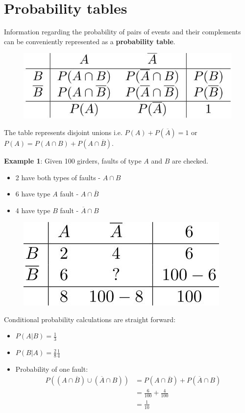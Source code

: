 \documentclass[10pt,a4paper]{article}
\begin{document}
\section{Probability tables}

Information regarding the probability of pairs of events and their complements can be conveniently
represented as a \textbf{probability table}.

\begin{figure} [h!]
    \centering
    \includegraphics[scale=0.5]{prob table.JPG}
\end{figure}

The table represents disjoint unions i.e. $P(A)+P(\overline{A})=1$ or $P(A)=P(A\cap B)+P(A\cap
\overline{B})$.

\textbf{Example 1}: Given 100 girders, faults of type $A$ and $B$ are checked. 
\begin{itemize}
    \item 2 have both types of faults - $A\cap B$ 
    \item 6 have type $A$ fault - $A\cap \overline{B}$
    \item 4 have type $B$ fault - $\overline{A}\cap B$
\end{itemize}

\begin{figure} [h!]
    \centering
    \includegraphics[scale=0.5]{Prob table 2.JPG}
\end{figure}

Conditional probability calculations are straight forward:
\begin{itemize}
    \item $P(A|B)=\frac{1}{3}$
    \item $P(B|A)=\frac{2}{8}\frac{1}{4}$
    \item Probability of one fault: 
    \begin{align*}
        P((A\cap \overline{B})\cup (\overline{A}\cap B)) &= P(A\cap \overline{B}) + P(\overline{A}\cap B) \\
        &= \frac{6}{100}+\frac{4}{100} \\
        &= \frac{1}{10}
    \end{align*}
\end{itemize}
\end{document}
